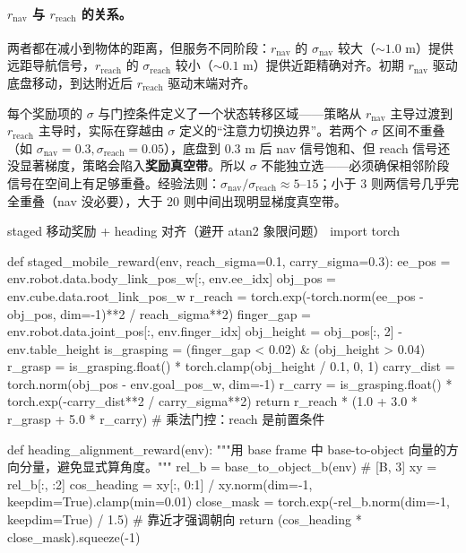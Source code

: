 \paragraph{$r_{\text{nav}}$ 与 $r_{\text{reach}}$ 的关系。}两者都在减小到物体的距离，但服务不同阶段：$r_{\text{nav}}$ 的 $\sigma_{\text{nav}}$ 较大（$\sim 1.0$ m）提供远距导航信号，$r_{\text{reach}}$ 的 $\sigma_{\text{reach}}$ 较小（$\sim 0.1$ m）提供近距精确对齐。初期 $r_{\text{nav}}$ 驱动底盘移动，到达附近后 $r_{\text{reach}}$ 驱动末端对齐。

\begin{insight}\label{ins:rlmc-wh-vacuum}
每个奖励项的 $\sigma$ 与门控条件定义了一个状态转移区域——策略从 $r_{\text{nav}}$ 主导过渡到 $r_{\text{reach}}$ 主导时，实际在穿越由 $\sigma$ 定义的“注意力切换边界”。若两个 $\sigma$ 区间不重叠（如 $\sigma_{\text{nav}}=0.3,\sigma_{\text{reach}}=0.05$），底盘到 $0.3$ m 后 nav 信号饱和、但 reach 信号还没显著梯度，策略会陷入\textbf{奖励真空带}。所以 $\sigma$ 不能独立选——必须确保相邻阶段信号在空间上有足够重叠。经验法则：$\sigma_{\text{nav}}/\sigma_{\text{reach}}\approx 5$--$15$；小于 3 则两信号几乎完全重叠（nav 没必要），大于 20 则中间出现明显梯度真空带。
\end{insight}

\begin{codebox}[Python]{staged 移动奖励 + heading 对齐（避开 atan2 象限问题）}
import torch

def staged_mobile_reward(env, reach_sigma=0.1, carry_sigma=0.3):
    ee_pos  = env.robot.data.body_link_pos_w[:, env.ee_idx]
    obj_pos = env.cube.data.root_link_pos_w
    r_reach = torch.exp(-torch.norm(ee_pos - obj_pos, dim=-1)**2 / reach_sigma**2)
    finger_gap = env.robot.data.joint_pos[:, env.finger_idx]
    obj_height = obj_pos[:, 2] - env.table_height
    is_grasping = (finger_gap < 0.02) & (obj_height > 0.04)
    r_grasp = is_grasping.float() * torch.clamp(obj_height / 0.1, 0, 1)
    carry_dist = torch.norm(obj_pos - env.goal_pos_w, dim=-1)
    r_carry = is_grasping.float() * torch.exp(-carry_dist**2 / carry_sigma**2)
    return r_reach * (1.0 + 3.0 * r_grasp + 5.0 * r_carry)   # 乘法门控：reach 是前置条件

def heading_alignment_reward(env):
    """用 base frame 中 base-to-object 向量的方向分量，避免显式算角度。"""
    rel_b = base_to_object_b(env)                          # [B, 3]
    xy = rel_b[:, :2]
    cos_heading = xy[:, 0:1] / xy.norm(dim=-1, keepdim=True).clamp(min=0.01)
    close_mask  = torch.exp(-rel_b.norm(dim=-1, keepdim=True) / 1.5)  # 靠近才强调朝向
    return (cos_heading * close_mask).squeeze(-1)
\end{codebox}

